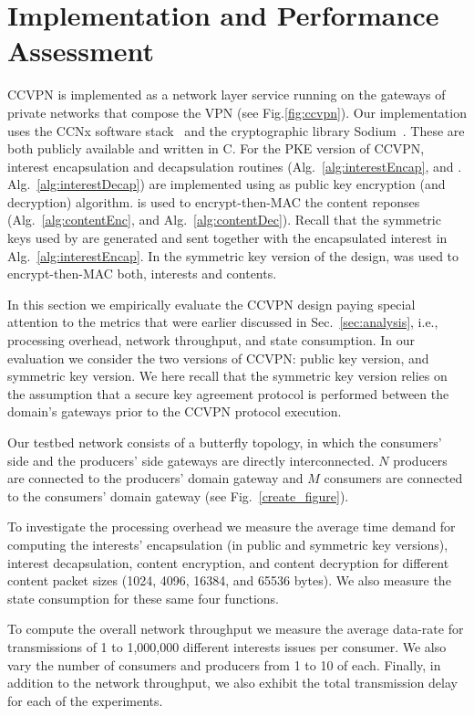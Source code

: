 \section{Implementation and Performance Assessment}


CCVPN is implemented as a network layer service running on the gateways of private networks that compose the VPN (see Fig.\ref{fig:ccvpn}).
Our implementation uses the CCNx software stack~\cite{CCNxGithub} and the cryptographic library Sodium~\cite{sodiumGithub}. These are both publicly available and written in C.
For the PKE version of CCVPN, interest encapsulation and decapsulation routines (Alg.~\ref{alg:interestEncap}, and . Alg.~\ref{alg:interestDecap}) are implemented using  as public key
encryption (and decryption) algorithm.  is used to encrypt-then-MAC the content reponses (Alg.~\ref{alg:contentEnc}, and Alg.~\ref{alg:contentDec}). Recall that the symmetric keys used by
 are generated and sent together with the encapsulated interest in Alg.~\ref{alg:interestEncap}.
In the symmetric key version of the design,  was used to encrypt-then-MAC both, interests and contents.



In this section we empirically evaluate the CCVPN design paying special attention to the metrics that were earlier discussed in Sec.~\ref{sec:analysis}, i.e., processing overhead, network throughput, and state consumption. In our evaluation we consider the two versions of CCVPN: public key version, and symmetric key version. We here recall that the symmetric key version relies on the assumption that a secure key agreement protocol is performed between the domain's gateways prior to the CCVPN protocol execution.

Our testbed network consists of a butterfly topology, in which the consumers' side and the producers' side gateways are directly interconnected. $N$ producers are connected to the producers' domain gateway and $M$ consumers are connected to the consumers' domain gateway (see Fig.~\ref{create_figure}).

To investigate the processing overhead we measure the average time demand for computing the interests' encapsulation (in public and symmetric key versions), interest decapsulation, content encryption, and content decryption for different content packet sizes (1024, 4096, 16384, and 65536 bytes). We also measure the state consumption for these same four functions.

To compute the overall network throughput we measure the average data-rate for transmissions of 1 to 1,000,000 different interests issues per consumer. We also vary the number of consumers and producers from 1 to 10 of each. Finally, in addition to the network throughput, we also exhibit the total transmission delay for each of the experiments.

